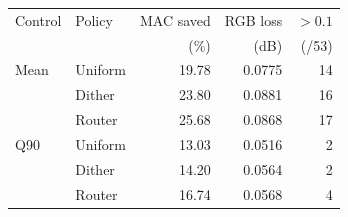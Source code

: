 \begin{tabular}{llrrr}
\toprule
Control & Policy & MAC saved & RGB loss & $>0.1$ \\
 & & (\%) & (dB) & (/53) \\
\midrule
Mean & Uniform & 19.78 & 0.0775 & 14 \\
 & Dither & 23.80 & 0.0881 & 16 \\
 & Router & 25.68 & 0.0868 & 17 \\
\midrule
Q90 & Uniform & 13.03 & 0.0516 & 2 \\
 & Dither & 14.20 & 0.0564 & 2 \\
 & Router & 16.74 & 0.0568 & 4 \\
\bottomrule
\end{tabular}
